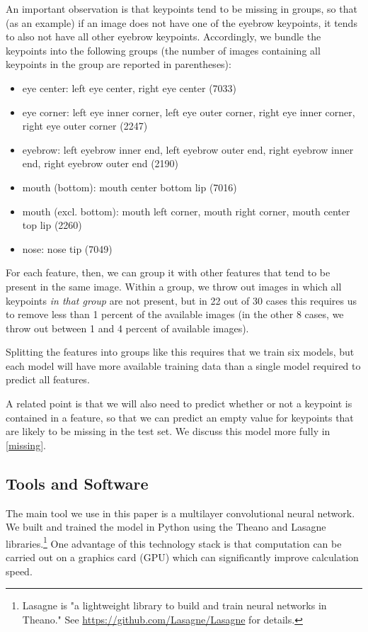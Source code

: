 \documentclass[journal]{IEEEtran}
\begin{document}
An important observation is that keypoints tend to be missing in groups, so that (as an example) if an image does not have one of the eyebrow keypoints, it tends to also not have all other eyebrow keypoints. Accordingly, we bundle the keypoints into the following groups (the number of images containing all keypoints in the group are reported in parentheses):
\begin{itemize}
\item eye center: left eye center, right eye center (7033)
\item eye corner: left eye inner corner, left eye outer corner, right eye inner corner, right eye outer corner (2247)
\item eyebrow: left eyebrow inner end, left eyebrow outer end, right eyebrow inner end, right eyebrow outer end (2190)
\item mouth (bottom): mouth center bottom lip (7016)
\item mouth (excl. bottom): mouth left corner, mouth right corner, mouth center top lip (2260)
\item nose: nose tip (7049)
\end{itemize}
For each feature, then, we can group it with other features that tend to be present in the same image. Within a group, we throw out images in which all keypoints \textit{in that group} are not present, but in 22 out of 30 cases this requires us to remove less than 1 percent of the available images (in the other 8 cases, we throw out between 1 and 4 percent of available images).

Splitting the features into groups like this requires that we train six models, but each model will have more available training data than a single model required to predict all features. 

A related point is that we will also need to predict whether or not a keypoint is contained in a feature, so that we can predict an empty value for keypoints that are likely to be missing in the test set. We discuss this model more fully in \cref{missing}.

\subsection{Tools and Software}

The main tool we use in this paper is a multilayer convolutional neural network. We built and trained the model in Python using the Theano and Lasagne libraries.\footnote{Lasagne is "a lightweight library to build and train neural networks in Theano." See \url{https://github.com/Lasagne/Lasagne} for details.} One advantage of this technology stack is that computation can be carried out on a graphics card (GPU) which can significantly improve calculation speed.
\end{document}
